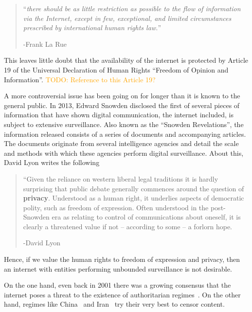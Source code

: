 \documentclass[a4paper,11pt]{book}
\newcommand\nicetohave[1]{\textcolor{orange}{TODO: #1}}
\theoremstyle{definition}
\begin{document}
\begin{quote}
    ``\textit{there should be as little restriction as possible  to  the  flow  of  information  via  the  Internet,
    except  in  few,  exceptional,  and  limited  circumstances  prescribed  by  international  human  rights  law.}'' 
    
    -Frank La Rue  
\end{quote}

This leaves little doubt that the availability of the internet is protected by Article 19 of
the Universal Declaration of Human Rights ``Freedom of Opinion and Information''. \nicetohave{Reference to this Article
19?}

A more controversial issue has been going on for longer than it is known to the general public.
In 2013, Edward Snowden disclosed the first of several pieces of information that
have shown digital communication, the internet included, is subject to extensive surveillance.
Also known as the ``Snowden Revelations'', the information released consists of a series
of documents and accompanying articles. The documents originate from several intelligence 
agencies and detail the scale and methods with which these agencies perform digital
surveillance. 
About this, David Lyon writes the following~\cite{lyon2014surveillance}

\begin{quote}
    ``Given the reliance on western liberal legal traditions
    it is hardly surprising that public debate generally 
    commences around the question of \textbf{privacy}.
    Understood as a human right, it underlies aspects of democratic polity,
    such as freedom of expression. 
    Often understood in the post-Snowden era as relating to 
    control of communications about oneself, 
    it is clearly a threatened value if not – according to some – a forlorn hope.

    -David Lyon
\end{quote}

Hence, if we value the human rights to freedom of expression and privacy, then an internet
with entities performing unbounded surveillance is not desirable. 

On the one hand, even back in 2001 there was a growing consensus that the internet poses
a threat to the existence of authoritarian regimes~\cite{kalathil2001internet}. 
On the other hand, regimes like China~\cite{endeshaw2004internet} and Iran~\cite{kimppa2010emancipatory}
try their very best to censor content. 
\end{document}
